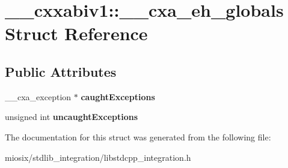 \hypertarget{struct____cxxabiv1_1_1____cxa__eh__globals}{\section{\-\_\-\-\_\-cxxabiv1\-:\-:\-\_\-\-\_\-cxa\-\_\-eh\-\_\-globals Struct Reference}
\label{struct____cxxabiv1_1_1____cxa__eh__globals}
}
\subsection*{Public Attributes}
\begin{DoxyCompactItemize}
\item 
\hypertarget{struct____cxxabiv1_1_1____cxa__eh__globals_a77348d2bb5877643cae07015a2453eb5}{\-\_\-\-\_\-cxa\-\_\-exception $\ast$ {\bfseries caught\-Exceptions}}\label{struct____cxxabiv1_1_1____cxa__eh__globals_a77348d2bb5877643cae07015a2453eb5}

\item 
\hypertarget{struct____cxxabiv1_1_1____cxa__eh__globals_a59d046223bdff74671ce9fc40d28bfa4}{unsigned int {\bfseries uncaught\-Exceptions}}\label{struct____cxxabiv1_1_1____cxa__eh__globals_a59d046223bdff74671ce9fc40d28bfa4}

\end{DoxyCompactItemize}


The documentation for this struct was generated from the following file\-:\begin{DoxyCompactItemize}
\item 
miosix/stdlib\-\_\-integration/libstdcpp\-\_\-integration.\-h\end{DoxyCompactItemize}
